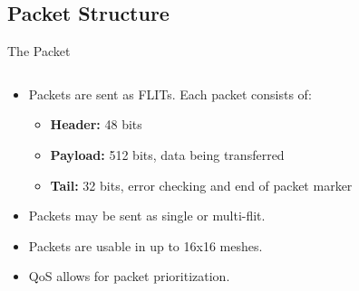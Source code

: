 \documentclass{beamer}
\begin{document}
\subsection{Packet Structure}
\begin{frame}{The Packet}
	\begin{columns}[T]
		\begin{column}{0.65\textwidth}
			\begin{itemize}
				\item Packets are sent as FLITs. Each packet consists of:
				\begin{itemize}
					\item \textbf{Header:} 48 bits
					\item \textbf{Payload:} 512 bits, data being transferred
					\item \textbf{Tail:} 32 bits, error checking and end of packet marker
				\end{itemize}
			\item Packets may be sent as single or multi-flit.
			\item Packets are usable in up to 16x16 meshes.
			\item QoS allows for packet prioritization.
			\end{itemize}
		\end{column}
		\begin{column}{0.3\textwidth}
			\begin{figure}
				\centering

\end{figure}
\end{column}
\end{columns}
\end{frame}
\end{document}
